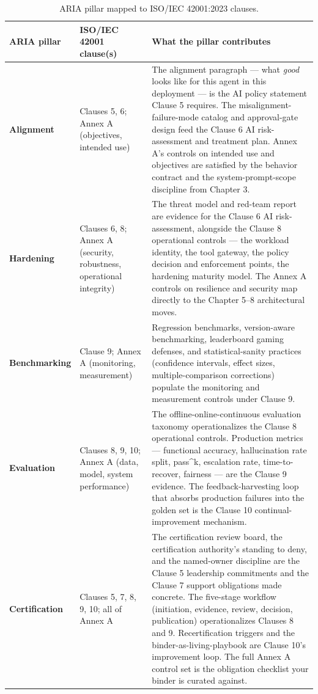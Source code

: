 \begin{table}[tb]
\centering
\small
\caption{ARIA pillar mapped to ISO/IEC 42001:2023 clauses.}
\begin{tabularx}{\textwidth}{@{}l l X@{}}
\toprule
\textbf{ARIA pillar} & \textbf{ISO/IEC 42001 clause(s)} & \textbf{What the pillar contributes} \\
\midrule
\textbf{Alignment} & Clauses 5, 6; Annex A (objectives, intended use) & The alignment paragraph --- what \textit{good} looks like for this agent in this deployment --- is the AI policy statement Clause 5 requires. The misalignment-failure-mode catalog and approval-gate design feed the Clause 6 AI risk-assessment and treatment plan. Annex A's controls on intended use and objectives are satisfied by the behavior contract and the system-prompt-scope discipline from Chapter 3. \\
\addlinespace
\textbf{Hardening} & Clauses 6, 8; Annex A (security, robustness, operational integrity) & The threat model and red-team report are evidence for the Clause 6 AI risk-assessment, alongside the Clause 8 operational controls --- the workload identity, the tool gateway, the policy decision and enforcement points, the hardening maturity model. The Annex A controls on resilience and security map directly to the Chapter 5--8 architectural moves. \\
\addlinespace
\textbf{Benchmarking} & Clause 9; Annex A (monitoring, measurement) & Regression benchmarks, version-aware benchmarking, leaderboard gaming defenses, and statistical-sanity practices (confidence intervals, effect sizes, multiple-comparison corrections) populate the monitoring and measurement controls under Clause 9. \\
\addlinespace
\textbf{Evaluation} & Clauses 8, 9, 10; Annex A (data, model, system performance) & The offline-online-continuous evaluation taxonomy operationalizes the Clause 8 operational controls. Production metrics --- functional accuracy, hallucination rate split, pass\textasciicircum{}k, escalation rate, time-to-recover, fairness --- are the Clause 9 evidence. The feedback-harvesting loop that absorbs production failures into the golden set is the Clause 10 continual-improvement mechanism. \\
\addlinespace
\textbf{Certification} & Clauses 5, 7, 8, 9, 10; all of Annex A & The certification review board, the certification authority's standing to deny, and the named-owner discipline are the Clause 5 leadership commitments and the Clause 7 support obligations made concrete. The five-stage workflow (initiation, evidence, review, decision, publication) operationalizes Clauses 8 and 9. Recertification triggers and the binder-as-living-playbook are Clause 10's improvement loop. The full Annex A control set is the obligation checklist your binder is curated against. \\
\bottomrule
\end{tabularx}
\end{table}
